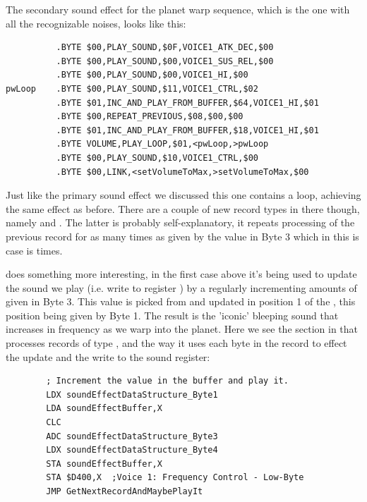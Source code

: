 The secondary sound effect for the planet warp sequence, which is the one with all the recognizable noises, looks like this:

\begin{lstlisting}
          .BYTE $00,PLAY_SOUND,$0F,VOICE1_ATK_DEC,$00
          .BYTE $00,PLAY_SOUND,$00,VOICE1_SUS_REL,$00
          .BYTE $00,PLAY_SOUND,$00,VOICE1_HI,$00
pwLoop    .BYTE $00,PLAY_SOUND,$11,VOICE1_CTRL,$02
          .BYTE $01,INC_AND_PLAY_FROM_BUFFER,$64,VOICE1_HI,$01
          .BYTE $00,REPEAT_PREVIOUS,$08,$00,$00
          .BYTE $01,INC_AND_PLAY_FROM_BUFFER,$18,VOICE1_HI,$01
          .BYTE VOLUME,PLAY_LOOP,$01,<pwLoop,>pwLoop
          .BYTE $00,PLAY_SOUND,$10,VOICE1_CTRL,$00
          .BYTE $00,LINK,<setVolumeToMax,>setVolumeToMax,$00
\end{lstlisting}

Just like the primary sound effect we discussed this one contains a loop, achieving the same effect as before. 
There are a couple of new record types in there though, namely  and .
The latter is probably self-explanatory, it repeats processing of the previous record for as many times as given by the 
value in Byte 3 which in this is case is  times.

 does something more interesting, in the first case above it's being used to update the sound we play
(i.e. write to register ) by a regularly incrementing amounts of  given in Byte 3. This value is picked
from and updated in position 1 of the , this position being given by Byte 1. The result is the 'iconic'
bleeping sound that increases in frequency as we warp into the planet. Here we see the section in  that
processes records of type , and the way it uses each byte in the record to effect the update
and the write to the sound register:

\begin{lstlisting}
        ; Increment the value in the buffer and play it.
        LDX soundEffectDataStructure_Byte1
        LDA soundEffectBuffer,X
        CLC
        ADC soundEffectDataStructure_Byte3
        LDX soundEffectDataStructure_Byte4
        STA soundEffectBuffer,X
        STA $D400,X  ;Voice 1: Frequency Control - Low-Byte
        JMP GetNextRecordAndMaybePlayIt
\end{lstlisting}


